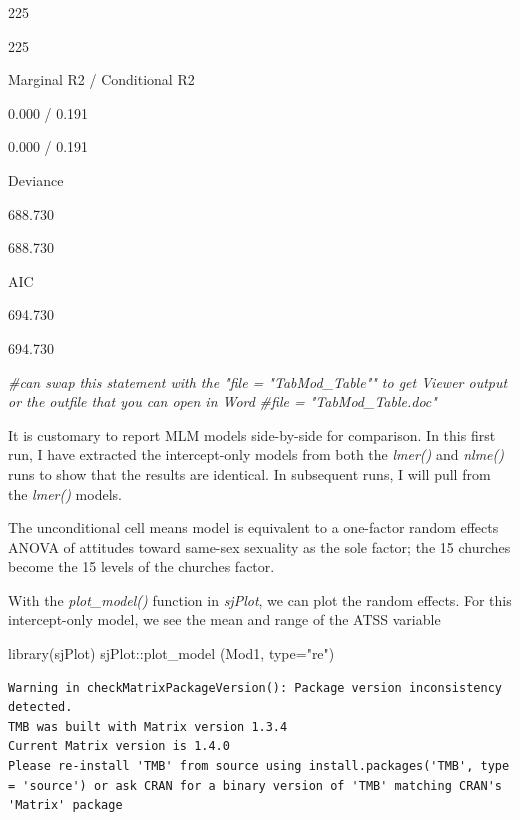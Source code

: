\documentclass[
  11pt,
]{book}
\newenvironment{Shaded}{\begin{snugshade}}{\end{snugshade}}
\newcommand{\AttributeTok}[1]{\textcolor[rgb]{0.77,0.63,0.00}{#1}}
\newcommand{\CommentTok}[1]{\textcolor[rgb]{0.56,0.35,0.01}{\textit{#1}}}
\newcommand{\FunctionTok}[1]{\textcolor[rgb]{0.00,0.00,0.00}{#1}}
\newcommand{\NormalTok}[1]{#1}
\newcommand{\SpecialCharTok}[1]{\textcolor[rgb]{0.00,0.00,0.00}{#1}}
\newcommand{\StringTok}[1]{\textcolor[rgb]{0.31,0.60,0.02}{#1}}
\begin{document}
225

225

Marginal R2 / Conditional R2

0.000 / 0.191

0.000 / 0.191

Deviance

688.730

688.730

AIC

694.730

694.730

\begin{Shaded}
\begin{Highlighting}[]
\CommentTok{\#can swap this statement with the "file = "TabMod\_Table"" to get Viewer output or the outfile that you can open in Word}
\CommentTok{\#file = "TabMod\_Table.doc"}
\end{Highlighting}
\end{Shaded}

It is customary to report MLM models side-by-side for comparison. In this first run, I have extracted the intercept-only models from both the \emph{lmer()} and \emph{nlme()} runs to show that the results are identical. In subsequent runs, I will pull from the \emph{lmer()} models.

The unconditional cell means model is equivalent to a one-factor random effects ANOVA of attitudes toward same-sex sexuality as the sole factor; the 15 churches become the 15 levels of the churches factor.

With the \emph{plot\_model()} function in \emph{sjPlot}, we can plot the random effects. For this intercept-only model, we see the mean and range of the ATSS variable

\begin{Shaded}
\begin{Highlighting}[]
\FunctionTok{library}\NormalTok{(sjPlot)}
\NormalTok{sjPlot}\SpecialCharTok{::}\FunctionTok{plot\_model}\NormalTok{ (Mod1, }\AttributeTok{type=}\StringTok{"re"}\NormalTok{)}
\end{Highlighting}
\end{Shaded}

\begin{verbatim}
Warning in checkMatrixPackageVersion(): Package version inconsistency detected.
TMB was built with Matrix version 1.3.4
Current Matrix version is 1.4.0
Please re-install 'TMB' from source using install.packages('TMB', type = 'source') or ask CRAN for a binary version of 'TMB' matching CRAN's 'Matrix' package
\end{verbatim}
\end{document}
